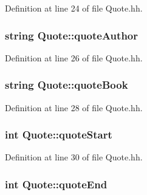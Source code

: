Definition at line 24 of file Quote.\+hh.

\hypertarget{class_quote_a930113c4ee0ae5e5506bbc1ea3e79b49}{
\subsubsection[{quote\+Author}]{\setlength{\rightskip}{0pt plus 5cm}string Quote\+::quote\+Author\hspace{0.3cm}{\ttfamily [private]}}}\label{class_quote_a930113c4ee0ae5e5506bbc1ea3e79b49}


Definition at line 26 of file Quote.\+hh.

\hypertarget{class_quote_a7e6968e086bdd45b40627a37ecbbf6fc}{
\subsubsection[{quote\+Book}]{\setlength{\rightskip}{0pt plus 5cm}string Quote\+::quote\+Book\hspace{0.3cm}{\ttfamily [private]}}}\label{class_quote_a7e6968e086bdd45b40627a37ecbbf6fc}


Definition at line 28 of file Quote.\+hh.

\hypertarget{class_quote_ac426122ac24638740b2a5c5e8342e8c9}{
\subsubsection[{quote\+Start}]{\setlength{\rightskip}{0pt plus 5cm}int Quote\+::quote\+Start\hspace{0.3cm}{\ttfamily [private]}}}\label{class_quote_ac426122ac24638740b2a5c5e8342e8c9}


Definition at line 30 of file Quote.\+hh.

\hypertarget{class_quote_aa5953a477b96183c8dc2fc8a42001c29}{
\subsubsection[{quote\+End}]{\setlength{\rightskip}{0pt plus 5cm}int Quote\+::quote\+End\hspace{0.3cm}{\ttfamily [private]}}}\label{class_quote_aa5953a477b96183c8dc2fc8a42001c29}


